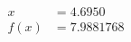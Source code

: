 \documentclass[preview]{standalone}
\begin{document}
\begin{align*}
x &= 4.6950\\f(x) &= 7.9881768
\end{align*}
\end{document}
